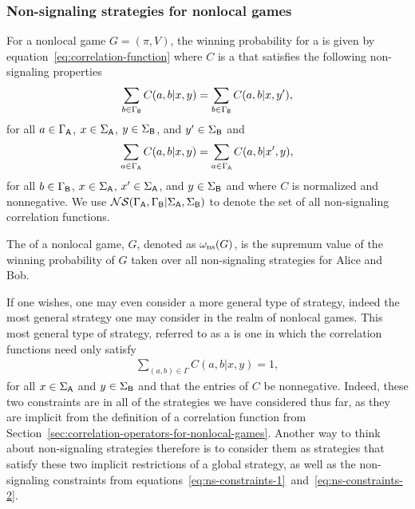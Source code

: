 \subsubsection*{Non-signaling strategies for nonlocal games}
\label{sec:non-signaling-strategies-for-nonlocal-games}

For a nonlocal game $G = (\pi,V)$, the winning probability for a  is given by equation~\eqref{eq:correlation-function} where $C$ is a  that satisfies the following non-signaling properties
\begin{align} \label{eq:ns-constraints-1}
	\sum_{b \in \Gamma_{\mathsf{B}}} C(a,b|x,y) = \sum_{b \in \Gamma_{\mathsf{B}}} C(a,b|x,y^{\prime}),
\end{align}
for all $a \in \Gamma_{\mathsf{A}}$, $x \in \Sigma_{\mathsf{A}}$, $y \in \Sigma_{\mathsf{B}}$, and $y^{\prime} \in \Sigma_{\mathsf{B}}$ and 
\begin{align} \label{eq:ns-constraints-2}
	\sum_{a \in \Gamma_{\mathsf{A}}} C(a,b|x,y) = \sum_{a \in \Gamma_{\mathsf{A}}} C(a,b|x^{\prime},y),
\end{align}
for all $b \in \Gamma_{\mathsf{B}}$, $x \in \Sigma_{\mathsf{A}}$, $x^{\prime} \in \Sigma_{\mathsf{A}}$, and $y \in \Sigma_{\mathsf{B}}$ and where $C$ is normalized and nonnegative. We use $\mathcal{NS}(\Gamma_{\mathsf{A}}, \Gamma_{\mathsf{B}} | \Sigma_{\mathsf{A}}, \Sigma_{\mathsf{B}})$ to denote the set of all non-signaling correlation functions. 

The  of a nonlocal game, $G$, denoted as $\omega_{\textnormal{ns}}(G)$, is the supremum value of the winning probability of $G$ taken over all non-signaling strategies for Alice and Bob.

If one wishes, one may even consider a more general type of strategy, indeed the most general strategy one may consider in the realm of nonlocal games. This most general type of strategy, referred to as a  is one in which the correlation functions need only satisfy
\begin{align}
	\sum_{(a,b) \in \Gamma} C(a,b|x,y) = 1, 
\end{align}
for all $x \in \Sigma_{\mathsf{A}}$ and $y \in \Sigma_{\mathsf{B}}$ and that the entries of $C$ be nonnegative. Indeed, these two constraints are in all of the strategies we have considered thus far, as they are implicit from the definition of a correlation function from Section~\ref{sec:correlation-operators-for-nonlocal-games}. Another way to think about non-signaling strategies therefore is to consider them as strategies that satisfy these two implicit restrictions of a global strategy, as well as the non-signaling constraints from equations~\eqref{eq:ns-constraints-1}~and~\eqref{eq:ns-constraints-2}.  

